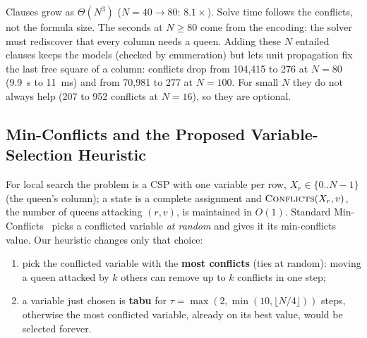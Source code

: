 \documentclass[conference]{IEEEtran}
\begin{document}
Clauses grow as $\Theta(N^3)$ ($N=40\to 80$: $8.1\times$). Solve time follows the conflicts, not the formula size. The seconds at $N\ge 80$ come from the encoding: the solver must rediscover that every column needs a queen. Adding these $N$ entailed clauses keeps the models (checked by enumeration) but lets unit propagation fix the last free square of a column: conflicts drop from 104,415 to 276 at $N=80$ (9.9~s to 11~ms) and from 70,981 to 277 at $N=100$. For small $N$ they do not always help (207 to 952 conflicts at $N=16$), so they are optional.

\subsection{Min-Conflicts and the Proposed Variable-Selection Heuristic}
For local search the problem is a CSP with one variable per row, $X_r\in\{0..N-1\}$ (the queen's column); a state is a complete assignment and $\textsc{Conflicts}(X_r,v)$, the number of queens attacking $(r,v)$, is maintained in $O(1)$. Standard Min-Conflicts~\cite{minconflicts} picks a conflicted variable \emph{at random} and gives it its min-conflicts value. Our heuristic changes only that choice:
\begin{enumerate}
    \item pick the conflicted variable with the \textbf{most conflicts} (ties at random): moving a queen attacked by $k$ others can remove up to $k$ conflicts in one step;
    \item a variable just chosen is \textbf{tabu} for $\tau=\max(2,\min(10,\lfloor N/4\rfloor))$ steps, otherwise the most conflicted variable, already on its best value, would be selected forever.
\end{enumerate}
\end{document}
